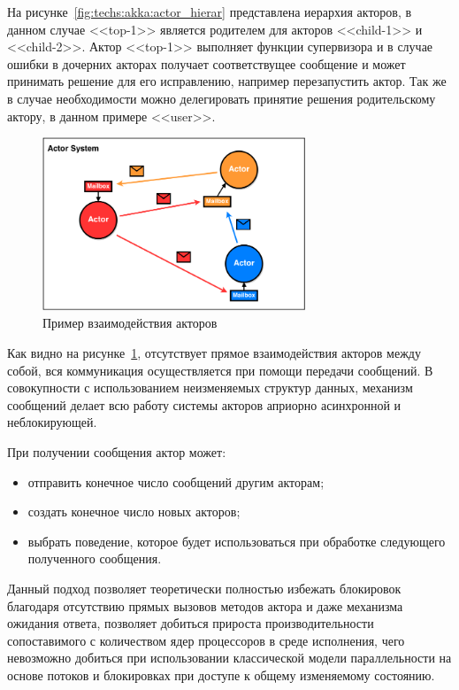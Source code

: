 На рисунке~\ref{fig:techs:akka:actor_hierar} представлена иерархия акторов, в данном случае <<top-1>> является родителем для акторов <<child-1>> и <<child-2>>. Актор <<top-1>> выполняет функции супервизора и в случае ошибки в дочерних акторах получает соответствущее сообщение и может принимать решение для его исправлению, например перезапустить актор. Так же в случае необходимости можно делегировать принятие решения родительскому актору, в данном примере <<user>>. 
\begin{figure}[ht]
    \centering
    \includegraphics[width=0.7\textwidth]{figures/actor_model.png}
    \caption{Пример взаимодействия акторов}
    \label{fig:techs:akka:actor_model:comulication}
\end{figure}

Как видно на рисунке~\ref{fig:techs:akka:actor_model:comulication}, отсутствует прямое взаимодействия акторов между собой, вся коммуникация осуществляется при помощи передачи сообщений. В совокупности с использованием неизменяемых структур данных, механизм сообщений делает всю работу системы акторов априорно асинхронной и неблокирующей.

При получении сообщения актор может:
\begin{itemize}
  \item отправить конечное число сообщений другим акторам;
  \item создать конечное число новых акторов;
  \item выбрать поведение, которое будет использоваться при обработке следующего полученного сообщения.
\end{itemize}

Данный подход позволяет теоретически полностью избежать блокировок благодаря отсутствию прямых вызовов методов актора и даже механизма ожидания ответа, позволяет добиться прироста производительности сопоставимого с количеством ядер процессоров в среде исполнения, чего невозможно добиться при использовании классической модели параллельности на основе потоков и блокировках при доступе к общему изменяемому состоянию.

